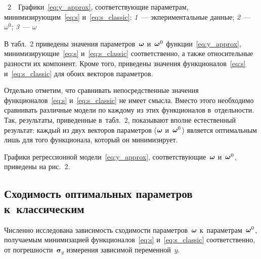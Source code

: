 \begin{multicols}{2}
{\noindent
{{\figurename~2}\ \ \small{Графики~\eqref{eq:y_approx}, соответствующие параметрам,
    минимизирующим~\eqref{eq:s} и~\eqref{eq:s_classic}:
    \textit{1}~--- экпериментальные данные;
    \textit{2}~--- $\omega^0$; \textit{3}~--- $\omega$}}
}

\vspace*{12pt}

\addtocounter{figure}{1}



В табл.~2 приведены значения параметров~$\boldsymbol{\omega}$ и~$\boldsymbol{\omega}^0$
функции~\eqref{eq:y_approx},
минимизирующие~\eqref{eq:s} и~\eqref{eq:s_classic} соответственно, а также 
относительные разности их компонент. Кроме того, приведены значения функционалов~\eqref{eq:s} 
и~\eqref{eq:s_classic} для обоих векторов параметров.



Отдельно отметим, что сравнивать непосредственные значения функционалов~\eqref{eq:s} 
и~\eqref{eq:s_classic} не имеет смысла. Вместо этого необходимо сравнивать 
различные модели по каждому из этих функционалов в~отдельности. Так, результаты, 
приведенные
в~табл.~2, показывают вполне естественный результат: каждый
из двух векторов параметров ($\boldsymbol{\omega}$ и~$\boldsymbol{\omega}^0$) является оптимальным лишь
для того функционала, который он минимизирует.

Графики регрессионной модели~\eqref{eq:y_approx}, соответствующие~$\boldsymbol{\omega}$ 
и~$\boldsymbol{\omega}^0$, приведены на рис.~2.


\subsection{Сходимость оптимальных параметров к~классическим}

Численно исследована зависимость сходимости параметров~$\boldsymbol{\omega}$ к~параметрам~$\boldsymbol{\omega}^0$,
получаемым минимизацией функционалов~\eqref{eq:s} и~\eqref{eq:s_classic} 
соответственно, от
погрешности~$\mathbf{\sigma}_y$ измерения зависимой переменной~$y$.

\begin{figure*}[b] %
\vspace*{1pt}
\begin{center}
\mbox{%
\epsfxsize=162.722mm
}
\end{center}
\vspace*{-9pt}
  \label{fig:conv_varY}
\end{figure*}


\end{multicols}
